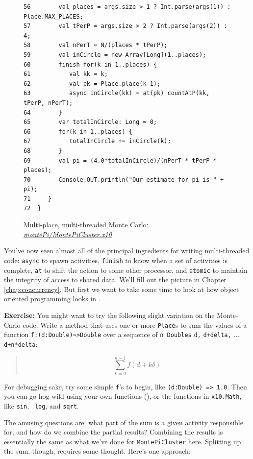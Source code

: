 \begin{figure}[!htbp]
\begin{verbatim}
56        val places = args.size > 1 ? Int.parse(args(1)) : Place.MAX_PLACES;
57        val tPerP = args.size > 2 ? Int.parse(args(2)) : 4;
58        val nPerT = N/(places * tPerP);
59        val inCircle = new Array[Long](1..places);
60        finish for(k in 1..places) {
61           val kk = k;
62           val pk = Place.place(k-1);
63           async inCircle(kk) = at(pk) countAtP(kk, tPerP, nPerT);
64        }
65        var totalInCircle: Long = 0;
66        for(k in 1..places) {
67           totalInCircle += inCircle(k);
68        }
69        val pi = (4.0*totalInCircle)/(nPerT * tPerP * places);
70        Console.OUT.println("Our estimate for pi is " + pi);
71     }
72  }
\end{verbatim}
\hrulefill
\caption{Multi-place, multi-threaded Monte Carlo:
\href{http://dist.codehaus.org/x10/documentation/guide/src/montePi/MontePiCluster.x10}{\em
montePi/MontePiCluster.x10}}\label{fig:mpmtmc}
\end{figure}

You've now seen almost all of the principal ingredients for writing multi-threaded
\Xten{} code: {\tt async} to spawn activities, {\tt finish} to know when a
set of activities is complete, {\tt at} to shift the action to some other
processor, and {\tt atomic} to maintain the integrity of access to shared
data.  We'll fill out the picture in Chapter \ref{chap:concurrency}.
But first we want to take some time to look at how object oriented
programming looks in \Xten.

{\bf Exercise:} You might want to try the following slight variation on the Monte-Carlo
code.   Write a method that
uses one or more {\tt Place}s to sum the values of a function  {\tt f:(d:Double)=>Double} over a 
sequence of {\tt n Doubles}  {\tt d,} {\tt d+delta,} ... {\tt d+n*delta}:

\begin{quote}\begin{equation}
\sum_{k=0}^{n-1}  f(d + k\delta)
\end{equation}
\end{quote}

For debugging sake, try some simple {\tt f}'s to begin, like {\tt (d:Double) =>
1.0}.  Then you can go hog-wild using your own functions (), or the functions in {\tt x10.Math}, like {\tt sin}, {\tt
log}, and {\tt sqrt}.

The amusing questions are: what part of the sum is a given activity responsible for,
and how do we combine the partial results?  Combining the results is essentially
the same as what we've done for {\tt MontePiCluster} here.  Splitting up the
sum, though, requires some thought.  Here's one approach:

